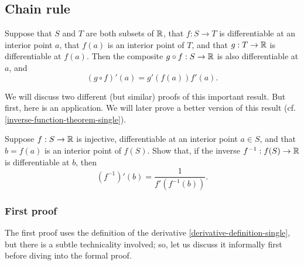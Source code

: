 \subsection{Chain rule} \label{chain-rule-single-section}

\begin{proposition} \label{chain-rule-single} 
	Suppose that $S$ and $T$ are both subsets of $\mathbb{R}$, that $f : S \to T$ is differentiable at an interior point $a$, that $f(a)$ is an interior point of $T$, and that $g : T \to \mathbb{R}$ is differentiable at $f(a)$. Then the composite $g \circ f : S \to \mathbb{R}$ is also differentiable at $a$, and 
	\[ (g \circ f)'(a) = g'(f(a))f'(a). \]
\end{proposition}

We will discuss two different (but similar) proofs of this important result. But first, here is an application. We will later prove a better version of this result (cf. \cref{inverse-function-theorem-single}). 

\begin{exercise} \label{inverse-derivative} 
	Suppose $f : S \to \mathbb{R}$ is injective, differentiable at an interior point $a \in S$, and that $b = f(a)$ is an interior point of $f(S)$. Show that, if the inverse $f^{-1} : f(S) \to \mathbb{R}$ is differentiable at $b$, then 
	\[ (f^{-1})'(b) = \frac{1}{f'(f^{-1}(b))}. \]
\end{exercise}

\subsubsection*{First proof}

The first proof uses the definition of the derivative \cref{derivative-definition-single}, but there is a subtle technicality involved; so, let us discuss it informally first before diving into the formal proof.  

